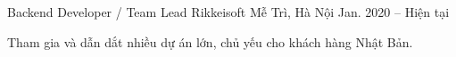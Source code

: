 

\begin{cventries}



\cventry
  {Backend Developer / Team Lead}
  {Rikkeisoft}
  {Mễ Trì, Hà Nội}
  {Jan. 2020 -- Hiện tại}
  {
    \begin{cvitems}
      \item {Tham gia và dẫn dắt nhiều dự án lớn, chủ yếu cho khách hàng Nhật Bản.}
    \end{cvitems}
  }


\end{cventries}
